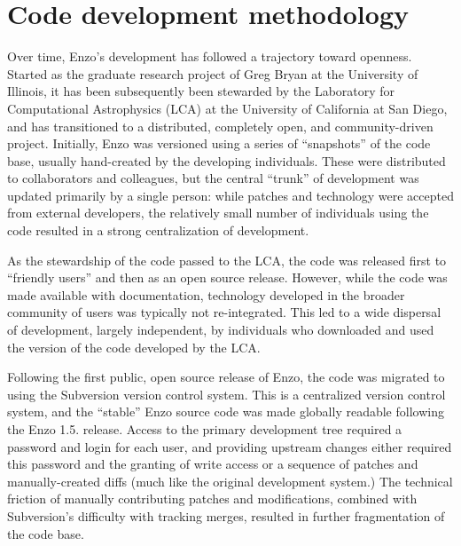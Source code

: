 
\section{Code development methodology}
\label{sec.development}

Over time, Enzo's development has followed a trajectory toward openness.
Started as the graduate research project of Greg Bryan at the University of
Illinois, it has been subsequently been stewarded by the Laboratory for
Computational Astrophysics (LCA) at the University of California at San Diego,
and has transitioned to a distributed, completely open, and community-driven
project.  Initially, Enzo was versioned using a series of ``snapshots'' of the
code base, usually hand-created by the developing individuals.  These were
distributed to collaborators and colleagues, but the central ``trunk'' of
development was updated primarily by a single person: while patches and
technology were accepted from external developers, the relatively small number
of individuals using the code resulted in a strong centralization of
development.

As the stewardship of the code passed to the LCA, the code was released first
to ``friendly users'' and then as an open source release.  However, while the
code was made available with documentation, technology developed in the broader
community of users was typically not re-integrated.  This led to a wide
dispersal of development, largely independent, by individuals who downloaded
and used the version of the code developed by the LCA.

Following the first public, open source release of Enzo, the code was migrated
to using the Subversion version control system.  This is a centralized version
control system, and the ``stable'' Enzo source code was made globally readable
following the Enzo 1.5. release.  Access to the primary development tree
required a password and login for each user, and providing upstream changes
either required this password and the granting of write access or a sequence of
patches and manually-created diffs (much like the original development system.)
The technical friction of manually contributing patches and modifications,
combined with Subversion's difficulty with tracking merges, resulted in further
fragmentation of the code base.

